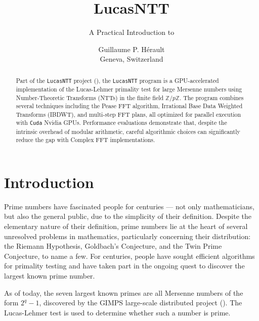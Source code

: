 \documentclass{article}
\subtitle{A Practical Introduction to}
\title{LucasNTT}
\author{
  Guillaume P. Hérault \\
  Geneva, Switzerland\\
}
\begin{document}
\maketitle
\theoremstyle{definition}



\begin{abstract}

Part of the \texttt{LucasNTT} project (\cite{LucasNTT}), the \texttt{LucasNTT} program is a GPU-accelerated implementation of the Lucas-Lehmer primality test for large Mersenne numbers using Number-Theoretic Transforms (NTTs) in the finite field $\mathbb{Z}/p\mathbb{Z}$. The program combines several techniques including the Pease FFT algorithm, Irrational Base Data Weighted Transforms (IBDWT), and multi-step FFT plans, all optimized for parallel execution with \texttt{Cuda} Nvidia GPUs. Performance evaluations demonstrate that, despite the intrinsic overhead of modular arithmetic, careful algorithmic choices can significantly reduce the gap with Complex FFT implementations.

\end{abstract}

\section{Introduction}

Prime numbers have fascinated people for centuries — not only mathematicians, but also the general public, due to the simplicity of their definition. Despite the elementary nature of their definition, prime numbers lie at the heart of several unresolved problems in mathematics, particularly concerning their distribution: the Riemann Hypothesis, Goldbach's Conjecture, and the Twin Prime Conjecture, to name a few.
For centuries, people have sought efficient algorithms for primality testing and have taken part in the ongoing quest to discover the largest known prime number.

As of today, the seven largest known primes are all Mersenne numbers of the form $2^q - 1$, discovered by the GIMPS large-scale distributed project (\cite{GIMPS}). The Lucas-Lehmer test is used to determine whether such a number is prime.
\end{document}
